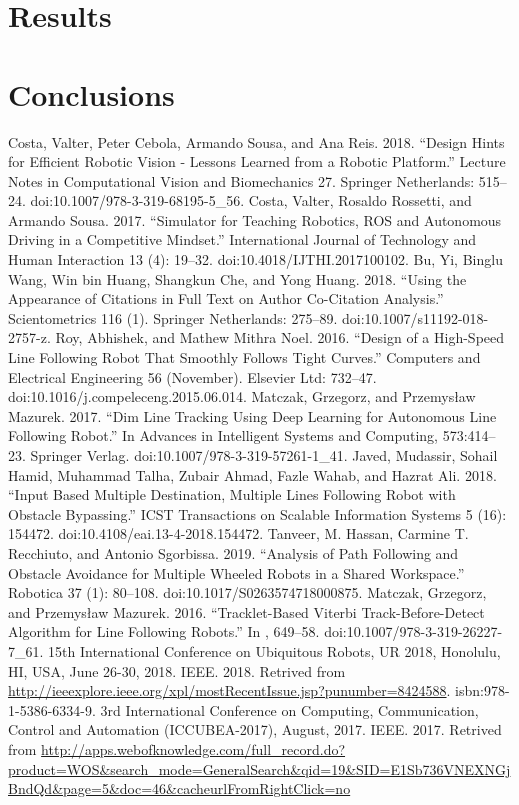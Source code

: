 \documentclass[conference]{IEEEtran}
\begin{document}
\section{Results} \label{results}


\section{Conclusions} \label{conclusions}


\begin{thebibliography}{00}
 Costa, Valter, Peter Cebola, Armando Sousa, and Ana Reis. 2018. “Design Hints for Efficient Robotic Vision - Lessons Learned from a Robotic Platform.” Lecture Notes in Computational Vision and Biomechanics 27. Springer Netherlands: 515–24. doi:10.1007/978-3-319-68195-5\_56.
 Costa, Valter, Rosaldo Rossetti, and Armando Sousa. 2017. “Simulator for Teaching Robotics, ROS and Autonomous Driving in a Competitive Mindset.” International Journal of Technology and Human Interaction 13 (4): 19–32. doi:10.4018/IJTHI.2017100102.
 Bu, Yi, Binglu Wang, Win bin Huang, Shangkun Che, and Yong Huang. 2018. “Using the Appearance of Citations in Full Text on Author Co-Citation Analysis.” Scientometrics 116 (1). Springer Netherlands: 275–89. doi:10.1007/s11192-018-2757-z.
 Roy, Abhishek, and Mathew Mithra Noel. 2016. “Design of a High-Speed Line Following Robot That Smoothly Follows Tight Curves.” Computers and Electrical Engineering 56 (November). Elsevier Ltd: 732–47. doi:10.1016/j.compeleceng.2015.06.014.
 Matczak, Grzegorz, and Przemysław Mazurek. 2017. “Dim Line Tracking Using Deep Learning for Autonomous Line Following Robot.” In Advances in Intelligent Systems and Computing, 573:414–23. Springer Verlag. doi:10.1007/978-3-319-57261-1\_41.
 Javed, Mudassir, Sohail Hamid, Muhammad Talha, Zubair Ahmad, Fazle Wahab, and Hazrat Ali. 2018. “Input Based Multiple Destination, Multiple Lines Following Robot with Obstacle Bypassing.” ICST Transactions on Scalable Information Systems 5 (16): 154472. doi:10.4108/eai.13-4-2018.154472.
 Tanveer, M. Hassan, Carmine T. Recchiuto, and Antonio Sgorbissa. 2019. “Analysis of Path Following and Obstacle Avoidance for Multiple Wheeled Robots in a Shared Workspace.” Robotica 37 (1): 80–108. doi:10.1017/S0263574718000875.
 Matczak, Grzegorz, and Przemysław Mazurek. 2016. “Tracklet-Based Viterbi Track-Before-Detect Algorithm for Line Following Robots.” In , 649–58. doi:10.1007/978-3-319-26227-7\_61.
 15th International Conference on Ubiquitous Robots, {UR} 2018, Honolulu, HI, USA, June 26-30, 2018. IEEE. 2018. Retrived from \url{http://ieeexplore.ieee.org/xpl/mostRecentIssue.jsp?punumber=8424588}. isbn:978-1-5386-6334-9.
 3rd International Conference on Computing, Communication, Control and Automation (ICCUBEA-2017), August, 2017. IEEE. 2017. Retrived from \url{http://apps.webofknowledge.com/full_record.do?product=WOS&search_mode=GeneralSearch&qid=19&SID=E1Sb736VNEXNGjBndQd&page=5&doc=46&cacheurlFromRightClick=no}
\end{thebibliography}

\vspace{12pt}
\end{document}
